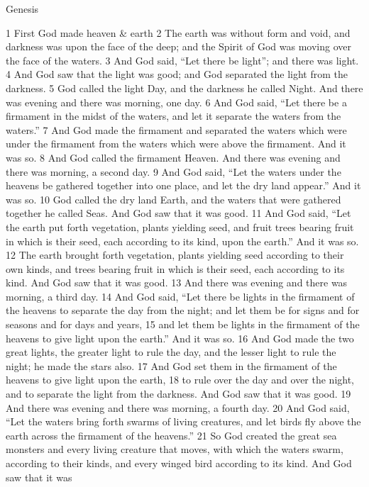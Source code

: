 Genesis



1 First God made heaven \& earth 2 The earth was without form
and void, and darkness was upon the face of the deep; and the
Spirit of God was moving over the face of the waters. 3 And God
said, ``Let there be light''; and there was light. 4 And God saw that
the light was good; and God separated the light from the darkness.
5 God called the light Day, and the darkness he called Night. And
there was evening and there was morning, one day. 6 And God said,
``Let there be a firmament in the midst of the waters, and let it
separate the waters from the waters.'' 7 And God made the firmament
and separated the waters which were under the firmament from the
waters which were above the firmament. And it was so. 8 And God
called the firmament Heaven. And there was evening and there was
morning, a second day. 9 And God said, ``Let the waters under the
heavens be gathered together into one place, and let the dry land
appear.'' And it was so. 10 God called the dry land Earth, and the
waters that were gathered together he called Seas. And God saw that
it was good. 11 And God said, ``Let the earth put forth vegetation,
plants yielding seed, and fruit trees bearing fruit in which is
their seed, each according to its kind, upon the earth.'' And it was
so. 12 The earth brought forth vegetation, plants yielding seed
according to their own kinds, and trees bearing fruit in which is
their seed, each according to its kind. And God saw that it was
good. 13 And there was evening and there was morning, a third day.
14 And God said, ``Let there be lights in the firmament of the
heavens to separate the day from the night; and let them be for
signs and for seasons and for days and years, 15 and let them be
lights in the firmament of the heavens to give light upon the
earth.'' And it was so. 16 And God made the two great lights, the
greater light to rule the day, and the lesser light to rule the
night; he made the stars also. 17 And God set them in the firmament
of the heavens to give light upon the earth, 18 to rule over the
day and over the night, and to separate the light from the
darkness. And God saw that it was good. 19 And there was evening
and there was morning, a fourth day. 20 And God said, ``Let the
waters bring forth swarms of living creatures, and let birds fly
above the earth across the firmament of the heavens.'' 21 So God
created the great sea monsters and every living creature that
moves, with which the waters swarm, according to their kinds, and
every winged bird according to its kind. And God saw that it was
